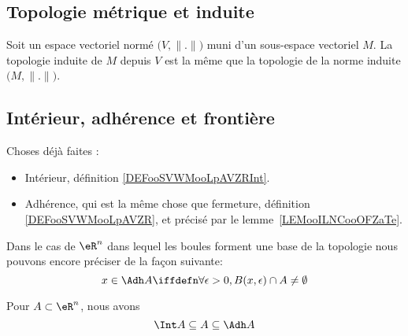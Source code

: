 \subsection{Topologie métrique et induite}

\begin{lemma}       \label{LEMooKDMYooMIcFRI}
	Soit un espace vectoriel normé \( \big( V,\| . \| \big)   \) muni d'un sous-espace vectoriel \( M\). La topologie induite de \( M\) depuis \( V\) est la même que la topologie de la norme induite \( \big( M,\| . \| \big)\).
\end{lemma}

\subsection{Intérieur, adhérence et frontière}

\begin{normaltext}
	Choses déjà faites :
	\begin{itemize}
		\item
		      Intérieur, définition \ref{DEFooSVWMooLpAVZRInt}.
		\item
		      Adhérence, qui est la même chose que fermeture, définition \ref{DEFooSVWMooLpAVZR}, et précisé par le lemme~\ref{LEMooILNCooOFZaTe}.
	\end{itemize}

	Dans le cas de \( \eR^n\) dans lequel les boules forment une base de la topologie nous pouvons encore préciser de la façon suivante:
	\begin{equation}
		x \in \Adh A \iffdefn \forall \epsilon > 0, B(x,\epsilon) \cap A \neq \emptyset
	\end{equation}
\end{normaltext}

\begin{proposition}
	Pour \( A \subset \eR^n\), nous avons
	\begin{equation}
		\Int A \subseteq A  \subseteq \Adh A
	\end{equation}
\end{proposition}

